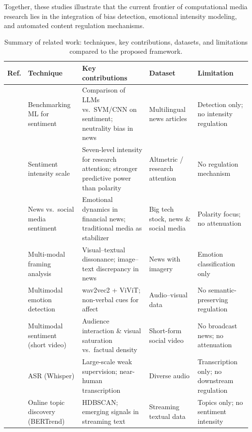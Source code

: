 \documentclass[final,1p,times]{elsarticle}
\begin{document}
Together, these studies illustrate that the current frontier of computational media research lies in the integration of bias detection, emotional intensity modeling, and automated content regulation mechanisms.

\begin{table}[H]
\centering
\caption{Summary of related work: techniques, key contributions, datasets, and limitations compared to the proposed framework.}
\label{tab:related_work}
\scriptsize
\setlength{\tabcolsep}{4pt}
\renewcommand{\arraystretch}{1.15}
\begin{tabular}{c p{2.1cm} p{3.4cm} p{2.4cm} p{3.2cm}}
\toprule
\textbf{Ref.} & \textbf{Technique} & \textbf{Key contributions} & \textbf{Dataset} & \textbf{Limitation} \\
\midrule
\cite{zanoli2025benchmarking} & Benchmarking ML for sentiment & Comparison of LLMs vs.\ SVM/CNN on sentiment; neutrality bias in news & Multilingual news articles & Detection only; no intensity regulation \\
\cite{areia2025sentiment} & Sentiment intensity scale & Seven-level intensity for research attention; stronger predictive power than polarity & Altmetric / research attention & No regulation mechanism \\
\cite{kim2025news} & News vs.\ social media sentiment & Emotional dynamics in financial news; traditional media as stabilizer & Big tech stock, news \& social media & Polarity focus; no attenuation \\
\cite{arora2025multi} & Multi-modal framing analysis & Visual–textual dissonance; image–text discrepancy in news & News with imagery & Emotion classification only \\
\cite{malik2025multimodal} & Multimodal emotion detection & wav2vec2 + ViViT; non-verbal cues for affect & Audio–visual data & No semantic-preserving regulation \\
\cite{he2025multimodal} & Multimodal sentiment (short video) & Audience interaction \& visual saturation vs.\ factual density & Short-form social video & No broadcast news; no attenuation \\
\cite{radford2025whisper} & ASR (Whisper) & Large-scale weak supervision; near-human transcription & Diverse audio & Transcription only; no downstream regulation \\
\cite{boutaleb2024bertrend} & Online topic discovery (BERTrend) & HDBSCAN; emerging signals in streaming text & Streaming textual data & Topics only; no sentiment intensity \\

\end{tabular}
\end{table}
\end{document}
